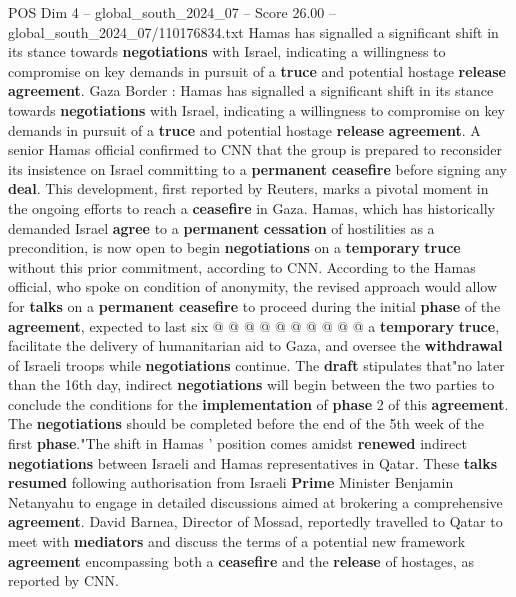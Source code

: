 \begin{textsample}{POS Dim 4 – global\_south\_2024\_07 – Score 26.00 – global\_south\_2024\_07/110176834.txt}  \label{ex:f4_pos_113}
Hamas has signalled a significant shift in its stance towards \textbf{negotiations} with Israel, indicating a willingness to compromise on key demands in pursuit of a \textbf{truce} and potential hostage \textbf{release} \textbf{agreement}.
Gaza Border : Hamas has signalled a significant shift in its stance towards \textbf{negotiations} with Israel, indicating a willingness to compromise on key demands in pursuit of a \textbf{truce} and potential hostage \textbf{release} \textbf{agreement}.
A senior Hamas official confirmed to CNN that the group is prepared to reconsider its insistence on Israel committing to a \textbf{permanent} \textbf{ceasefire} before signing any \textbf{deal}.
This development, first reported by Reuters, marks a pivotal moment in the ongoing efforts to reach a \textbf{ceasefire} in Gaza.
Hamas, which has historically demanded Israel \textbf{agree} to a \textbf{permanent} \textbf{cessation} of hostilities as a precondition, is now open to begin \textbf{negotiations} on a \textbf{temporary} \textbf{truce} without this prior commitment, according to CNN.
According to the Hamas official, who spoke on condition of anonymity, the revised approach would allow for \textbf{talks} on a \textbf{permanent} \textbf{ceasefire} to proceed during the initial \textbf{phase} of the \textbf{agreement}, expected to last six @ @ @ @ @ @ @ @ @ @ a \textbf{temporary} \textbf{truce}, facilitate the delivery of humanitarian aid to Gaza, and oversee the \textbf{withdrawal} of Israeli troops while \textbf{negotiations} continue.
The \textbf{draft} stipulates that"no later than the 16th day, indirect \textbf{negotiations} will begin between the two parties to conclude the conditions for the \textbf{implementation} of \textbf{phase} 2 of this \textbf{agreement}.
The \textbf{negotiations} should be completed before the end of the 5th week of the first \textbf{phase}."The shift in Hamas ' position comes amidst \textbf{renewed} indirect \textbf{negotiations} between Israeli and Hamas representatives in Qatar.
These \textbf{talks} \textbf{resumed} following authorisation from Israeli \textbf{Prime} Minister Benjamin Netanyahu to engage in detailed discussions aimed at brokering a comprehensive \textbf{agreement}.
David Barnea, Director of Mossad, reportedly travelled to Qatar to meet with \textbf{mediators} and discuss the terms of a potential new framework \textbf{agreement} encompassing both a \textbf{ceasefire} and the \textbf{release} of hostages, as reported by CNN.

\end{textsample}
